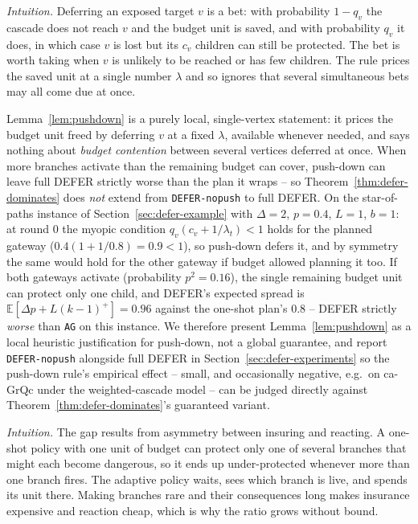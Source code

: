 \documentclass[ijoc,sglanonrev]{informs4}
\begin{document}
\emph{Intuition.} Deferring an exposed target $v$ is a bet: with
probability $1-q_v$ the cascade does not reach $v$ and the budget unit is
saved, and with probability $q_v$ it does, in which case $v$ is lost but its
$c_v$ children can still be protected. The bet is worth taking when $v$ is
unlikely to be reached or has few children. The rule prices the saved unit
at a single number $\lambda$ and so ignores that several simultaneous bets
may all come due at once.

\begin{remark}\label{rem:pushdown-counterexample}
Lemma~\ref{lem:pushdown} is a purely local, single-vertex statement: it
prices the budget unit freed by deferring $v$ at a fixed $\lambda$,
available whenever needed, and says nothing about \emph{budget contention}
between several vertices deferred at once. When more branches activate
than the remaining budget can cover, push-down can leave full DEFER
strictly worse than the plan it wraps -- so Theorem~\ref{thm:defer-dominates}
does \emph{not} extend from \texttt{DEFER-nopush} to full DEFER. On the
star-of-paths instance of Section~\ref{sec:defer-example} with $\Delta=2$,
$p=0.4$, $L=1$, $b=1$: at round $0$ the myopic condition
$q_v(c_v+1/\lambda_t)<1$ holds for the planned gateway
($0.4(1+1/0.8)=0.9<1$), so push-down defers it, and by symmetry the same
would hold for the other gateway if budget allowed planning it too. If
both gateways activate (probability $p^2=0.16$), the single remaining
budget unit can protect only one child, and DEFER's expected spread is
$\mathbb E[\Delta p+L(k-1)^+]=0.96$ against the one-shot plan's $0.8$
-- DEFER strictly \emph{worse} than \texttt{AG} on this instance. We
therefore present Lemma~\ref{lem:pushdown} as a local heuristic
justification for push-down, not a global guarantee, and report
\texttt{DEFER-nopush} alongside full DEFER in
Section~\ref{sec:defer-experiments} so the push-down rule's empirical
effect -- small, and occasionally negative, e.g.\ on ca-GrQc under the
weighted-cascade model -- can be judged directly against
Theorem~\ref{thm:defer-dominates}'s guaranteed variant.
\end{remark}

\emph{Intuition.} The gap results from asymmetry between insuring and
reacting. A one-shot policy with one unit of budget can protect only one of
several branches that might each become dangerous, so it ends up
under-protected whenever more than one branch fires. The adaptive policy waits,
sees which branch is live, and spends its unit there. Making branches rare
and their consequences long makes insurance expensive and reaction cheap,
which is why the ratio grows without bound.
\end{document}
